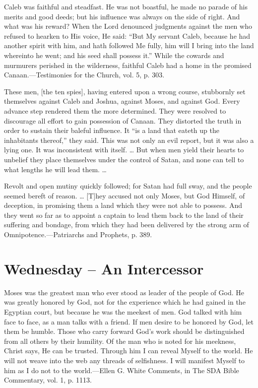\documentclass[a4paper, 10pt, twoside, headings=small]{scrartcl}
\begin{document}
\begin{multicols}{2}
Caleb was faithful and steadfast. He was not boastful, he made no parade of his merits and good deeds; but his influence was always on the side of right. And what was his reward? When the Lord denounced judgments against the men who refused to hearken to His voice, He said: “But My servant Caleb, because he had another spirit with him, and hath followed Me fully, him will I bring into the land whereinto he went; and his seed shall possess it.” While the cowards and murmurers perished in the wilderness, faithful Caleb had a home in the promised Canaan.—Testimonies for the Church, vol. 5, p. 303.

These men, [the ten spies], having entered upon a wrong course, stubbornly set themselves against Caleb and Joshua, against Moses, and against God. Every advance step rendered them the more determined. They were resolved to discourage all effort to gain possession of Canaan. They distorted the truth in order to sustain their baleful influence. It “is a land that eateth up the inhabitants thereof,” they said. This was not only an evil report, but it was also a lying one. It was inconsistent with itself. … But when men yield their hearts to unbelief they place themselves under the control of Satan, and none can tell to what lengths he will lead them. …

Revolt and open mutiny quickly followed; for Satan had full sway, and the people seemed bereft of reason. … [T]hey accused not only Moses, but God Himself, of deception, in promising them a land which they were not able to possess. And they went so far as to appoint a captain to lead them back to the land of their suffering and bondage, from which they had been delivered by the strong arm of Omnipotence.—Patriarchs and Prophets, p. 389.

\section*{Wednesday – An Intercessor}

Moses was the greatest man who ever stood as leader of the people of God. He was greatly honored by God, not for the experience which he had gained in the Egyptian court, but because he was the meekest of men. God talked with him face to face, as a man talks with a friend. If men desire to be honored by God, let them be humble. Those who carry forward God’s work should be distinguished from all others by their humility. Of the man who is noted for his meekness, Christ says, He can be trusted. Through him I can reveal Myself to the world. He will not weave into the web any threads of selfishness. I will manifest Myself to him as I do not to the world.—Ellen G. White Comments, in The SDA Bible Commentary, vol. 1, p. 1113.


\end{multicols}
\end{document}
